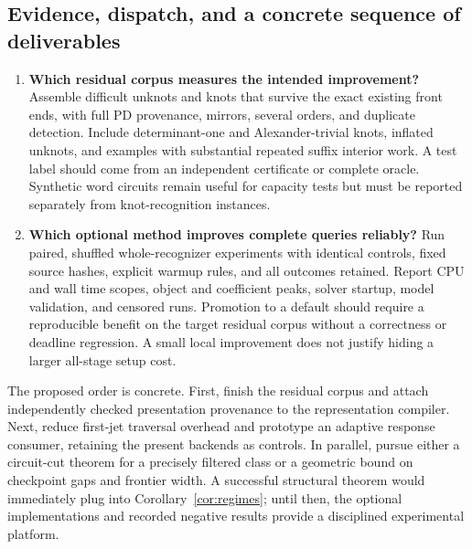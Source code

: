 \subsection{Evidence, dispatch, and a concrete sequence of deliverables}

\begin{enumerate}[label=\textbf{Q\arabic*.},leftmargin=3em,start=17]
\item \textbf{Which residual corpus measures the intended improvement?}
Assemble difficult unknots and knots that survive the exact existing
front ends, with full PD provenance, mirrors, several orders, and
duplicate detection. Include determinant-one and Alexander-trivial knots,
inflated unknots, and examples with substantial repeated suffix interior
work. A test label should come from an independent certificate or complete
oracle. Synthetic word circuits remain useful for capacity tests but
must be reported separately from knot-recognition instances.

\item \textbf{Which optional method improves complete queries reliably?}
Run paired, shuffled whole-recognizer experiments with identical controls,
fixed source hashes, explicit warmup rules, and all outcomes retained.
Report CPU and wall time scopes, object and coefficient peaks, solver
startup, model validation, and censored runs. Promotion to a default
should require a reproducible benefit on the target residual corpus
without a correctness or deadline regression. A small local improvement
does not justify hiding a larger all-stage setup cost.
\end{enumerate}

The proposed order is concrete. First, finish the residual corpus and
attach independently checked presentation provenance to the representation
compiler. Next, reduce first-jet traversal overhead and prototype an
adaptive response consumer, retaining the present backends as controls.
In parallel, pursue either a circuit-cut theorem for a precisely filtered
class or a geometric bound on checkpoint gaps and frontier width. A
successful structural theorem would immediately plug into
Corollary~\ref{cor:regimes}; until then, the optional implementations and
recorded negative results provide a disciplined experimental platform.
